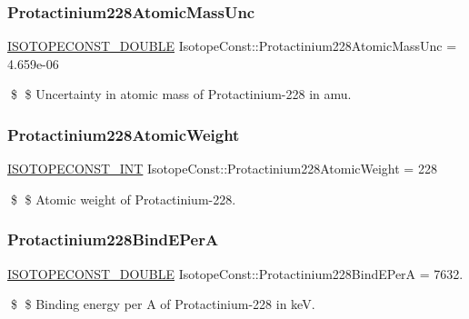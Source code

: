 \subsubsection{\texorpdfstring{Protactinium228\+Atomic\+Mass\+Unc}{Protactinium228AtomicMassUnc}}
{\footnotesize\ttfamily \mbox{\hyperlink{group___isotope_const-_macros_ga8f45a7272ce02c0b4c65c44636ed719a}{I\+S\+O\+T\+O\+P\+E\+C\+O\+N\+S\+T\+\_\+\+D\+O\+U\+B\+LE}} Isotope\+Const\+::\+Protactinium228\+Atomic\+Mass\+Unc = 4.\+659e-\/06}

\$ \$ Uncertainty in atomic mass of Protactinium-\/228 in amu. \mbox{\label{group___isotope_const-_protactinium-_pa228_ga3ca1342684e6c1701346459c0498c0e4}} 
\subsubsection{\texorpdfstring{Protactinium228\+Atomic\+Weight}{Protactinium228AtomicWeight}}
{\footnotesize\ttfamily \mbox{\hyperlink{group___isotope_const-_macros_ga5f18360b3e99483a35c32d789e62621c}{I\+S\+O\+T\+O\+P\+E\+C\+O\+N\+S\+T\+\_\+\+I\+NT}} Isotope\+Const\+::\+Protactinium228\+Atomic\+Weight = 228}

\$ \$ Atomic weight of Protactinium-\/228. \mbox{\label{group___isotope_const-_protactinium-_pa228_gaabc197f472b6a711ebd49aa2a464dcfd}} 
\subsubsection{\texorpdfstring{Protactinium228\+Bind\+E\+PerA}{Protactinium228BindEPerA}}
{\footnotesize\ttfamily \mbox{\hyperlink{group___isotope_const-_macros_ga8f45a7272ce02c0b4c65c44636ed719a}{I\+S\+O\+T\+O\+P\+E\+C\+O\+N\+S\+T\+\_\+\+D\+O\+U\+B\+LE}} Isotope\+Const\+::\+Protactinium228\+Bind\+E\+PerA = 7632.}

\$ \$ Binding energy per A of Protactinium-\/228 in keV. \mbox{\label{group___isotope_const-_protactinium-_pa228_ga4802b679db646202db066ed22d7543ad}} 

